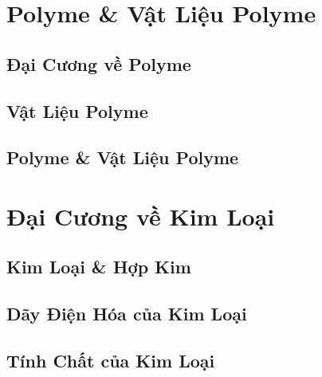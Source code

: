 \documentclass{article}
\numberwithin{equation}{section}
\begin{document}

\section{Polyme \& Vật Liệu Polyme}

\subsection{Đại Cương về Polyme}


\subsection{Vật Liệu Polyme}


\subsection{Polyme \& Vật Liệu Polyme}


\section{Đại Cương về Kim Loại}

\subsection{Kim Loại \& Hợp Kim}


\subsection{Dãy Điện Hóa của Kim Loại}


\subsection{Tính Chất của Kim Loại}
\end{document}
